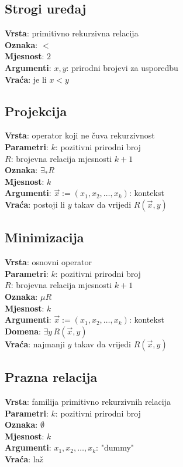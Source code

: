 \subsection{Strogi uređaj}
\textbf{Vrsta}: primitivno rekurzivna relacija\\
\textbf{Oznaka}: $<$\\
\textbf{Mjesnost}: $2$\\
\textbf{Argumenti}: $x,y$: prirodni brojevi za usporedbu\\
\textbf{Vraća}: je li $x<y$

\subsection{Projekcija}
\textbf{Vrsta}: operator koji ne čuva rekurzivnost\\
\textbf{Parametri}: $k$: pozitivni prirodni broj\\
$R$: brojevna relacija mjesnosti $k+1$\\
\textbf{Oznaka}: $\exists_*R$\\
\textbf{Mjesnost}: $k$\\
\textbf{Argumenti}: $\vec x:=(x_1,x_2,\dots,x_k)$: kontekst\\
\textbf{Vraća}: postoji li $y$ takav da vrijedi $R(\vec x,y)$

\subsection{Minimizacija}
\textbf{Vrsta}: osnovni operator\\
\textbf{Parametri}: $k$: pozitivni prirodni broj\\
$R$: brojevna relacija mjesnosti $k+1$\\
\textbf{Oznaka}: $\mu R$\\
\textbf{Mjesnost}: $k$\\
\textbf{Argumenti}: $\vec x:=(x_1,x_2,\dots,x_k)$: kontekst\\
\textbf{Domena}: $\exists y\,R(\vec x,y)$\\
\textbf{Vraća}: najmanji $y$ takav da vrijedi $R(\vec x,y)$

\subsection{Prazna relacija}
\textbf{Vrsta}: familija primitivno rekurzivnih relacija\\
\textbf{Parametri}: $k$: pozitivni prirodni broj\\
\textbf{Oznaka}: $\emptyset$\\
\textbf{Mjesnost}: $k$\\
\textbf{Argumenti}: $x_1,x_2,\dots,x_k$: "dummy"\\
\textbf{Vraća}: laž

